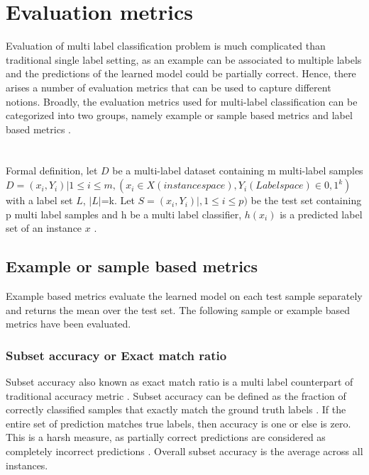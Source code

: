 \section{Evaluation metrics} \label{Evaluation_metrics}
Evaluation of multi label classification problem is much complicated than traditional single label setting, as an example can be associated to multiple labels and the predictions of the learned model could be partially correct\cite{sorower2010literature}\cite{zhang2013review}. Hence, there arises a number of evaluation metrics that can be used to capture different notions. 
Broadly, the evaluation metrics used for multi-label classification can be categorized into two groups, namely example or sample based metrics and label based metrics \cite{zhang2013review}.
\\

\\
\\
Formal definition, let $D$ be a multi-label dataset containing m multi-label samples $D = {(x_i,Y_i)|1\leq i \leq m}, (x_i \in X (instance space), Y_i (Label space) \in {0,1}^k)$ with a label set $L$, $|L|$=k. Let $S = {(x_i,Y_i) | ,1\leq i \leq p)}$ be the test set containing p multi label samples and h be a multi label classifier, $h(x_i)$ is a predicted label set of an instance $x$ \cite{zhang2013review}.

\subsection{Example or sample based metrics}
Example based metrics evaluate the learned model on each test sample separately and returns the mean over the test set\cite{zhang2013review}. The following sample or example based metrics have been evaluated.
 
\subsubsection{Subset accuracy or Exact match ratio}
 Subset accuracy also known as exact match ratio is a multi label counterpart of traditional accuracy metric \cite{zhang2013review}. Subset accuracy can be defined as the fraction of correctly classified samples that exactly match the ground truth labels \cite{zhang2013review}. If the entire set of prediction matches true labels, then accuracy is one or else is zero. This is a harsh measure, as partially correct predictions are considered as completely incorrect predictions\cite{sorower2010literature} \cite{zhang2010multi}.  Overall subset accuracy is the average across all instances. 

